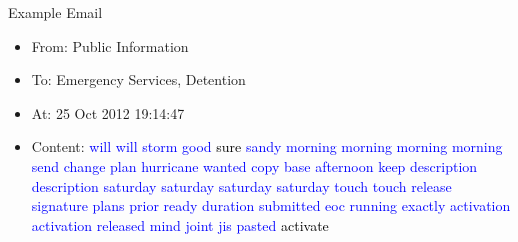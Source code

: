 \documentclass[10pt, xcolor=table]{beamer}
\theoremstyle{definition}
\theoremstyle{remark}
\begin{document}
\begin{frame}{Example Email}
\begin{itemize}
	\item From: Public Information\\
	\item To: Emergency Services, Detention\\
	\item At: 25 Oct 2012 19:14:47\\
	\item Content:
\textcolor{blue}{ will will storm good \textcolor{black}{sure} sandy morning morning morning morning send change plan hurricane wanted copy base afternoon keep description description saturday saturday saturday saturday touch touch release signature plans prior ready duration submitted eoc running exactly activation activation released mind joint jis pasted \textcolor{black}{activate}}
	\end{itemize}
\end{frame}
\end{document}
